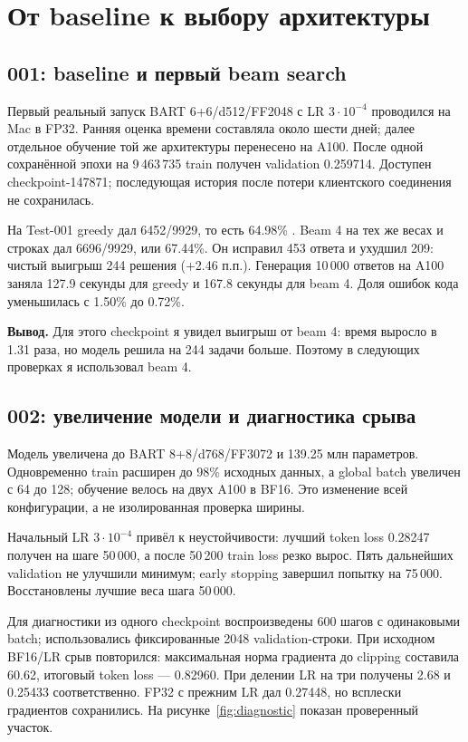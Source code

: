 \section{От baseline к выбору архитектуры}

\subsection{001: baseline и первый beam search}
Первый реальный запуск BART 6+6/d512/FF2048 с LR $3\cdot10^{-4}$
проводился на Mac в FP32. Ранняя оценка времени составляла около шести
дней; далее отдельное обучение той же архитектуры перенесено на A100.
После одной сохранённой эпохи на 9\,463\,735 train получен
validation \loss{} 0.259714. Доступен checkpoint-147871;
последующая история после потери клиентского соединения не сохранилась.

На Test-001 greedy дал 6452/9929, то есть 64.98\% \pass{}.
Beam 4 на тех же весах и строках дал 6696/9929, или 67.44\%.
Он исправил 453 ответа и ухудшил 209: чистый выигрыш 244 решения
(+2.46 п.п.). Генерация 10\,000 ответов на A100 заняла
127.9 секунды для greedy и 167.8 секунды для beam 4.
Доля ошибок кода уменьшилась с 1.50\% до 0.72\%.

\textbf{Вывод.} Для этого checkpoint я увидел выигрыш от beam 4:
время выросло в 1.31 раза, но модель решила на 244 задачи больше.
Поэтому в следующих проверках я использовал beam 4.

\subsection{002: увеличение модели и диагностика срыва}
Модель увеличена до BART 8+8/d768/FF3072 и 139.25 млн параметров.
Одновременно train расширен до 98\% исходных данных, а global batch
увеличен с 64 до 128; обучение велось на двух A100 в BF16.
Это изменение всей конфигурации, а не изолированная проверка ширины.

Начальный LR $3\cdot10^{-4}$ привёл к неустойчивости:
лучший token loss 0.28247 получен на шаге 50\,000,
а после 50\,200 train loss резко вырос. Пять дальнейших validation
не улучшили минимум; early stopping завершил попытку на 75\,000.
Восстановлены лучшие веса шага 50\,000.

Для диагностики из одного checkpoint воспроизведены 600 шагов с
одинаковыми batch; использовались фиксированные 2048 validation-строки.
При исходном BF16/LR срыв повторился: максимальная норма градиента до
clipping составила 60.62, итоговый token loss --- 0.82960.
При делении LR на три получены 2.68 и 0.25433 соответственно.
FP32 с прежним LR дал 0.27448, но всплески градиентов сохранились.
На рисунке~\ref{fig:diagnostic} показан проверенный участок.

